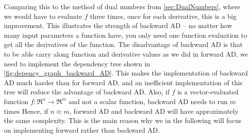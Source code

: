 Comparing this to the method of dual numbers from \autoref{sec:DualNumbers}, where we would have to evaluate $f$ three times, once for each derivative, this is a big improvement. This illustrates the strength of backward AD -- no matter how many input parameters a function have, you only need one function evaluation to get all the derivatives of the function. 
The disadvantage of backward AD is that to be able carry along function and derivative values as we did in forward AD, we need to implement the dependency tree shown in \autoref{fig:depency_graph_backward_AD}. This makes the implementation of backward AD much harder than for forward AD, and an inefficient implementation of this tree will reduce the advantage of backward AD. Also, if $f$ is a vector-evaluated function $f: \Re^n \rightarrow \Re^m$ and not a scalar function, backward AD needs to run $m$ times Hence, if $n\approx m$, forward AD and backward AD will have approximately the same complexity. This is the main reason why we in the following will focus on implementing forward rather than backward AD.

